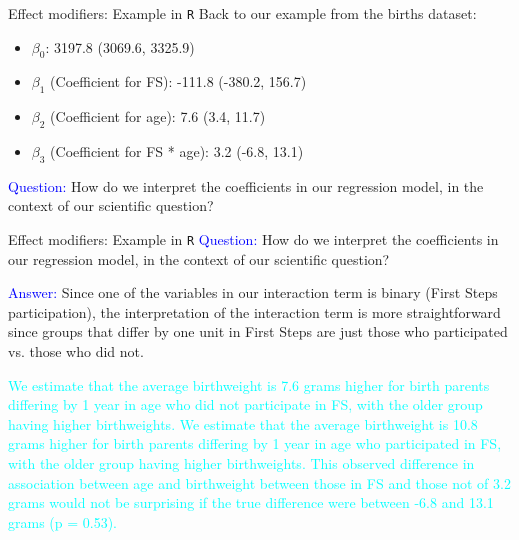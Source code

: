 \documentclass[10pt,t]{beamer}
\begin{document}
\begin{frame}{Effect modifiers: Example in \texttt{R}}
Back to our example from the births dataset:

\vspace{0.3cm}

\begin{itemize}
	\item $\beta_0$: 3197.8 (3069.6, 3325.9)
	\item $\beta_1$ (Coefficient for FS): -111.8 (-380.2, 156.7)
	\item $\beta_2$ (Coefficient for age): 7.6 (3.4, 11.7)
	\item $\beta_3$ (Coefficient for FS * age): 3.2 (-6.8, 13.1)
\end{itemize}

\vspace{0.3cm}


\textcolor{blue}{Question:} How do we interpret the coefficients in our regression model, in the context of our scientific question? 
\end{frame}

\begin{frame}{Effect modifiers: Example in \texttt{R}}
\textcolor{blue}{Question:} How do we interpret the coefficients in our regression model, in the context of our scientific question? 

\vspace{0.3cm}

\textcolor{blue}{Answer:} Since one of the variables in our interaction term is binary (First Steps participation), the interpretation of the interaction term is more straightforward since groups that differ by one unit in First Steps are just those who participated vs. those who did not.

\vspace{0.3cm}

\textcolor{cyan}{We estimate that the average birthweight is 7.6 grams higher for birth parents differing by 1 year in age who did not participate in FS, with the older group having higher birthweights. We estimate that the average birthweight is 10.8 grams higher for birth parents differing by 1 year in age who participated in FS, with the older group having higher birthweights. This observed difference in association between age and birthweight between those in FS and those not of 3.2 grams would not be surprising if the true difference were between -6.8 and 13.1 grams (p = 0.53).}

\end{frame}
\end{document}

